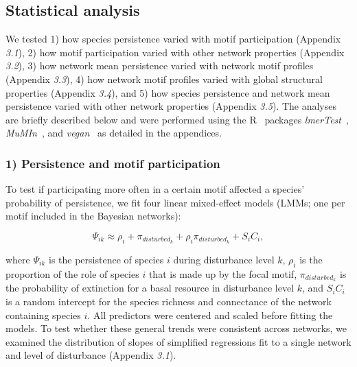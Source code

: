 \documentclass[12pt]{article}
\begin{document}
\begin{spacing}{2.0}
	\subsection*{Statistical analysis} 

	We tested 1) how species persistence varied with motif participation (Appendix \emph{3.1}), 2) how motif participation varied with other network properties (Appendix \emph{3.2}), 3) how network mean persistence varied with network motif profiles (Appendix \emph{3.3}), 4) how network motif profiles varied with global structural properties (Appendix \emph{3.4}), and 5) how species persistence and network mean persistence varied with other network properties (Appendix \emph{3.5}). The analyses are briefly described below and were performed using the R~\citep{R} packages \emph{lmerTest}~\citep{lmerTest}, \emph{MuMIn}~\citep{MuMIn}, and \emph{vegan}~\citep{vegan} as detailed in the appendices.

    
    \subsubsection*{1) Persistence and motif participation}

        To test if participating more often in a certain motif affected a species' probability of persistence, we fit four linear mixed-effect models (LMMs; one per motif included in the Bayesian networks):       
            
            \begin{equation}
                \Psi_{ik} \approx \rho_{i} + \pi_{disturbed_k} + \rho_{i}\pi_{disturbed_k} +
                S_{i}C_{i} ,
                \label{propreq}
            \end{equation}

        \noindent where $\Psi_{ik}$ is the persistence of species $i$ during disturbance level $k$, $\rho_{i}$ is the proportion of the role of species $i$ that is made up by the focal motif, $\pi_{disturbed_k}$ is the probability of extinction for a basal resource in disturbance level $k$, and $S_{i}C_{i}$ is a random intercept for the species richness and connectance of the network containing species $i$.
        All predictors were centered and scaled before fitting the models.         
        To test whether these general trends were consistent across networks, we examined the distribution of slopes of simplified regressions fit to a single network and level of disturbance (Appendix \emph{3.1}).
    

\end{spacing}
\end{document}
